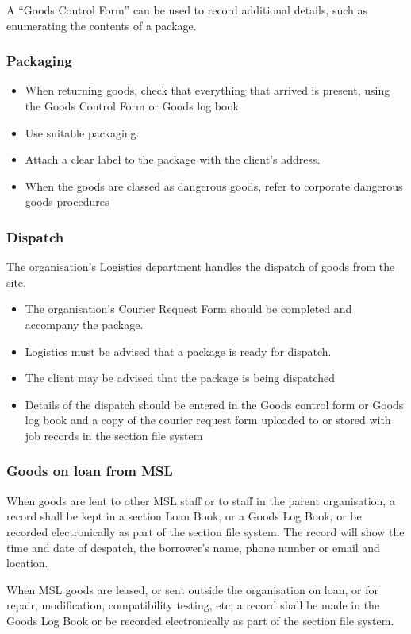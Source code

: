 A ``Goods Control Form'' can be used to record additional details, such as enumerating the contents of a package. 

\subsubsection{Packaging}
\begin{itemize}
\item When returning goods, check that everything that arrived is present, using the Goods Control Form or Goods log book.
\item Use suitable packaging.
\item Attach a clear label to the package with the client's address.
\item When the goods are classed as dangerous goods, refer to corporate dangerous goods procedures
\end{itemize}

\subsubsection{Dispatch}
The organisation’s Logistics department handles the dispatch of goods from the site.
\begin{itemize}
\item The organisation’s Courier Request Form  should be completed and accompany the package.
\item Logistics must be advised that a package is ready for dispatch.
\item The client may be advised that the package is being dispatched
\item Details of the dispatch should be entered in the Goods control form or Goods log book and a copy of the courier request form uploaded to  or stored with job records in the section file system
\end{itemize}

\subsubsection{Goods on loan from MSL}
When goods are lent to other MSL staff or to staff in the parent organisation, a record shall be kept in a section Loan Book, or a Goods Log Book, or be recorded electronically as part of the section file system. The record will show the time and date of despatch, the borrower’s name, phone number or email and location.

When MSL goods are leased, or sent outside the organisation on loan, or for repair, modification, compatibility testing, etc, a record shall be made in the Goods Log Book or be recorded electronically as part of the section file system. 